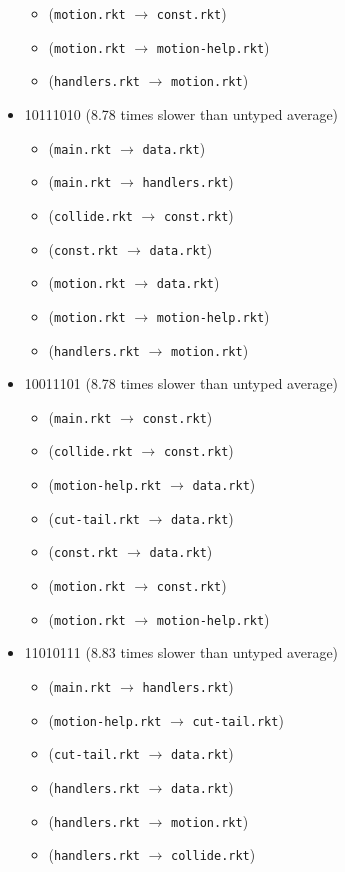 \documentclass{article}
\newcommand{\mono}[1]{\texttt{#1}}
\begin{document}
\begin{itemize}
\begin{itemize}
  \item (\mono{motion.rkt} $\rightarrow$ \mono{const.rkt})
  \item (\mono{motion.rkt} $\rightarrow$ \mono{motion-help.rkt})
  \item (\mono{handlers.rkt} $\rightarrow$ \mono{motion.rkt})
  \end{itemize}
\item 10111010 (8.78 times slower than untyped average)
  \begin{itemize}
  \item (\mono{main.rkt} $\rightarrow$ \mono{data.rkt})
  \item (\mono{main.rkt} $\rightarrow$ \mono{handlers.rkt})
  \item (\mono{collide.rkt} $\rightarrow$ \mono{const.rkt})
  \item (\mono{const.rkt} $\rightarrow$ \mono{data.rkt})
  \item (\mono{motion.rkt} $\rightarrow$ \mono{data.rkt})
  \item (\mono{motion.rkt} $\rightarrow$ \mono{motion-help.rkt})
  \item (\mono{handlers.rkt} $\rightarrow$ \mono{motion.rkt})
  \end{itemize}
\item 10011101 (8.78 times slower than untyped average)
  \begin{itemize}
  \item (\mono{main.rkt} $\rightarrow$ \mono{const.rkt})
  \item (\mono{collide.rkt} $\rightarrow$ \mono{const.rkt})
  \item (\mono{motion-help.rkt} $\rightarrow$ \mono{data.rkt})
  \item (\mono{cut-tail.rkt} $\rightarrow$ \mono{data.rkt})
  \item (\mono{const.rkt} $\rightarrow$ \mono{data.rkt})
  \item (\mono{motion.rkt} $\rightarrow$ \mono{const.rkt})
  \item (\mono{motion.rkt} $\rightarrow$ \mono{motion-help.rkt})
  \end{itemize}
\item 11010111 (8.83 times slower than untyped average)
  \begin{itemize}
  \item (\mono{main.rkt} $\rightarrow$ \mono{handlers.rkt})
  \item (\mono{motion-help.rkt} $\rightarrow$ \mono{cut-tail.rkt})
  \item (\mono{cut-tail.rkt} $\rightarrow$ \mono{data.rkt})
  \item (\mono{handlers.rkt} $\rightarrow$ \mono{data.rkt})
  \item (\mono{handlers.rkt} $\rightarrow$ \mono{motion.rkt})
  \item (\mono{handlers.rkt} $\rightarrow$ \mono{collide.rkt})
  \end{itemize}


\end{itemize}
\end{document}
